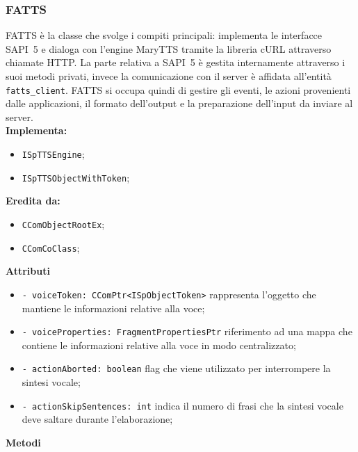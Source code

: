 	\subsubsection{FATTS}
	FATTS è la classe che svolge i compiti principali: implementa le interfacce SAPI~5 e dialoga con l'engine MaryTTS tramite la libreria cURL attraverso chiamate HTTP. La parte relativa a SAPI~5 è gestita internamente attraverso i suoi metodi privati, invece la comunicazione con il server è affidata all'entità \texttt{fatts\_client}. FATTS si occupa quindi di gestire gli eventi, le azioni provenienti dalle applicazioni, il formato dell'output e la preparazione dell'input da inviare al server.\\    
	\textbf{Implementa:}
	\begin{itemize}
		\item \texttt{ISpTTSEngine};
		\item \texttt{ISpTTSObjectWithToken};
	\end{itemize}
	\textbf{Eredita da:}
	\begin{itemize}
		\item \texttt{CComObjectRootEx};
		\item \texttt{CComCoClass};
	\end{itemize}
	\textbf{Attributi}
		\begin{itemize}
			\item \texttt{- voiceToken: CComPtr<ISpObjectToken>} rappresenta l'oggetto che mantiene le informazioni relative alla voce;
			\item \texttt{- voiceProperties: FragmentPropertiesPtr} riferimento ad una mappa che contiene le informazioni relative alla voce in modo centralizzato;
			\item \texttt{- actionAborted: boolean} flag che viene utilizzato per interrompere la sintesi vocale;
			\item \texttt{- actionSkipSentences: int} indica il numero di frasi che la sintesi vocale deve saltare durante l'elaborazione;   
		\end{itemize}
	\textbf{Metodi}
